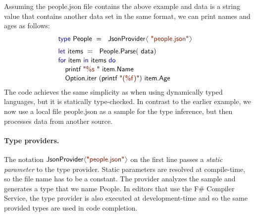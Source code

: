 \documentclass[10pt,preprint,clearpagebib]{sigplanconf}
\newcommand{\langl}{\begin{picture}(4.5,7)
\put(1.1,2.5){\rotatebox{60}{\line(1,0){5.5}}}
\put(1.1,2.5){\rotatebox{300}{\line(1,0){5.5}}}
\end{picture}}
\newcommand{\rangl}{\begin{picture}(4.5,7)
\put(.9,2.5){\rotatebox{120}{\line(1,0){5.5}}}
\put(.9,2.5){\rotatebox{240}{\line(1,0){5.5}}}
\end{picture}}
\newcommand{\kvd}[1]{\textnormal{\textcolor{kvdclr}{\sffamily #1}}}
\newcommand{\str}[1]{\textnormal{\textcolor{strclr}{\sffamily "#1"}}}
\newcommand{\strf}[1]{\textnormal{\textcolor{strclr}{\sffamily #1}}}
\newcommand{\ident}[1]{\textnormal{\sffamily #1}}
\begin{document}
Assuming the \strf{people.json} file contains the above example and \ident{data} is a string value
that contains another data set in the same format, we can print names and ages as follows:
%
\begin{equation*}
\begin{array}{l}
 \kvd{type}~\ident{People}~=~\ident{JsonProvider}\langl\str{people.json}\rangl\hspace{1em} \\[0.6em]
 \kvd{let}~\ident{items}~=~\ident{People.Parse}(\ident{data})\\[0.1em]
 \kvd{for}~\ident{item}~\kvd{in}~\ident{items}~\kvd{do}\\[0.1em]
 \quad\ident{printf}~\str{\%s }~\ident{item.Name}\\[0.1em]
 \quad\ident{Option.iter}~(\ident{printf}~\str{(\%f)})~\ident{item.Age}
\end{array}
\end{equation*}
%
The code achieves the same simplicity as when using dynamically typed languages, but it is statically 
type-checked. In contrast to the earlier example, we now use a local file \strf{people.json} as a 
sample for the type inference, but then processes data from another source. 

\paragraph{Type providers.}
The notation $\ident{JsonProvider}\langl\str{people.json}\rangl$ on the first line passes a 
\emph{static parameter} to the type provider. Static parameters are resolved at compile-time, 
so the file name has to be a constant. The provider analyzes the sample and generates
a type that we name \ident{People}. In editors that use the F\# Compiler Service, the 
type provider is also executed at development-time and so the same provided types are
used in code completion.
\end{document}
